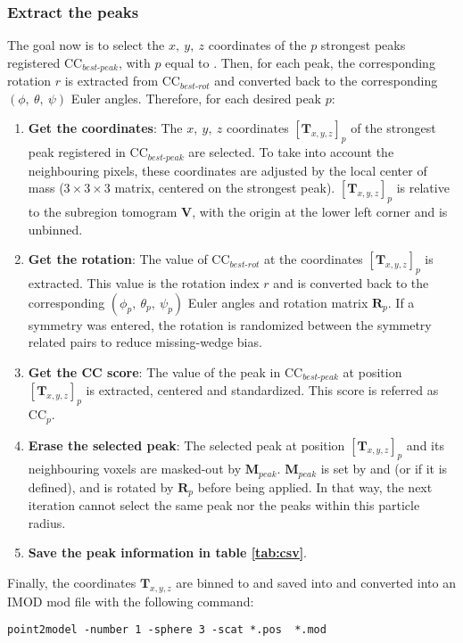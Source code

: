 \subsubsection{Extract the peaks} \label{sec:algo:picking:extract_peaks}

The goal now is to select the $x,\ y,\ z$ coordinates of the $p$ strongest peaks registered $\bm{\mathrm{CC}}_{best\text{-}peak}$, with $p$ equal to . Then, for each peak, the corresponding rotation $r$ is extracted from $\bm{\mathrm{CC}}_{best\text{-}rot}$ and converted back to the corresponding $(\phi,\ \theta,\ \psi)$ Euler angles. Therefore, for each desired peak $p$:
\begin{enumerate}
    \item \textbf{Get the coordinates}: The $x,\ y,\ z$ coordinates ${[\bm{T}_{x,y,z}]}_p$ of the strongest peak registered in $\bm{\mathrm{CC}}_{best\text{-}peak}$ are selected. To take into account the neighbouring pixels, these coordinates are adjusted by the local center of mass ($3\times3\times3$ matrix, centered on the strongest peak). ${[\bm{T}_{x,y,z}]}_p$ is relative to the subregion tomogram $\bm{V}$, with the origin at the lower left corner and is unbinned.
    
    \item \textbf{Get the rotation}: The value of $\bm{\mathrm{CC}}_{best\text{-}rot}$ at the coordinates ${[\bm{T}_{x,y,z}]}_p$ is extracted. This value is the rotation index $r$ and is converted back to the corresponding $(\phi_p,\ \theta_p,\ \psi_p)$ Euler angles and rotation matrix $\bm{R}_p$. If a symmetry was entered, the rotation is randomized between the symmetry related pairs to reduce missing-wedge bias.
    
    \item \textbf{Get the CC score}: The value of the peak in $\bm{\mathrm{CC}}_{best\text{-}peak}$ at position ${[\bm{T}_{x,y,z}]}_p$ is extracted, centered and standardized. This score is referred as $\bm{\mathrm{CC}}_p$.
        
    \item \textbf{Erase the selected peak}: The selected peak at position ${[\bm{T}_{x,y,z}]}_p$ and its neighbouring voxels are masked-out by $\bm{M}_{peak}$. $\bm{M}_{peak}$ is set by  and  (or  if it is defined), and is rotated by $\bm{R}_p$ before being applied. In that way, the next iteration cannot select the same peak nor the peaks within this particle radius.

    \item \textbf{Save the peak information in table \ref{tab:csv}}.
\end{enumerate}
Finally, the coordinates $\bm{T}_{x,y,z}$ are binned to  and saved into  and converted into an IMOD mod file with the following command:
\begin{lstlisting}
point2model -number 1 -sphere 3 -scat *.pos  *.mod
\end{lstlisting}


